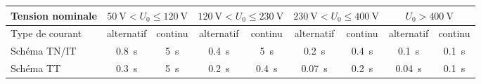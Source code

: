 \begin{exemple}
\begin{table}[h]
\begin{tabularx}{\linewidth}{X cccccccc}
\toprule
Tension nominale		& \multicolumn{2}{c}{$\SI{50}{\volt}<U_0\leq\SI{120}{\volt}$} 	& \multicolumn{2}{c}{$\SI{120}{\volt}<U_0\leq\SI{230}{\volt}$} & \multicolumn{2}{c}{$\SI{230}{\volt}<U_0\leq\SI{400}{\volt}$}		& \multicolumn{2}{c}{$U_0>\SI{400}{\volt}$}\\
\midrule
Type de courant		& alternatif	& continu	& alternatif	& continu	& alternatif	& continu	& alternatif	& continu \\
\addlinespace
Schéma TN/IT	& \SI{0,8}{\second}	&	\SI{5}{\second}	&	\SI{0,4}{\second}	&	\SI{5}{\second}	&	\SI{0,2}{\second}	&	\SI{0,4}{\second}	&	\SI{0,1}{\second}	&	\SI{0,1}{\second} \\	
\addlinespace
Schéma TT	& \SI{0,3}{\second}	&	\SI{5}{\second}	&	\SI{0,2}{\second}	&	\SI{0,4}{\second}	&	\cellcolor{green}\SI{0,07}{\second}	&	\SI{0,2}{\second}	&	\SI{0,04}{\second}	&	\SI{0,1}{\second} \\	
\bottomrule
\end{tabularx}
\end{table}
\end{exemple}


